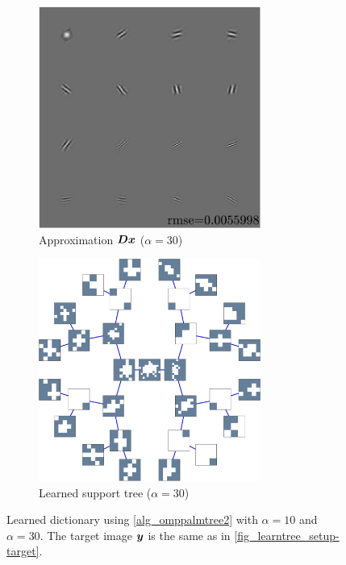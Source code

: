 \begin{figure}[!ht] \ContinuedFloat
\begin{subfigure}[b]{0.49\textwidth}\centering
\includegraphics[width=0.8\textwidth]{figures/tree-unbalanced-supp/xp_learnsupp256_curvelet_decomp3[tree-binary_dpth4]_supp-diracs_[usegrad1_every5_add5_totinit0_totadd279_alpha30]_approx.pdf}
\caption{Approximation $\bm{D}\bm{x}$ ($\alpha=30$)}\label{fig_test_omppalmtree2-approx_alpha30}
\end{subfigure}
\begin{subfigure}[b]{0.49\textwidth}\centering
\includegraphics[width=0.8\textwidth]{figures/tree-unbalanced-supp/xp_learnsupp256_curvelet_decomp3[tree-binary_dpth4]_supp-diracs_[usegrad1_every5_add5_totinit0_totadd279_alpha30]_tree.pdf}
\caption{Learned support tree ($\alpha=30$)}\label{fig_test_omppalmtree2-tree_alpha30}
\end{subfigure}
\caption{Learned dictionary using \cref{alg_omppalmtree2} with $\alpha=10$ and $\alpha=30$. The target image $\bm{y}$ is the same as in \cref{fig_learntree_setup-target}.}\label{fig_test_omppalmtree2}
\end{figure}

